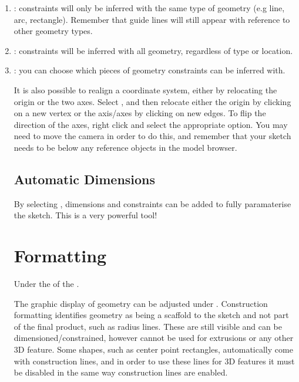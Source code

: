 \begin{enumerate}
    \item {}: constraints will only be inferred with the same type of geometry (e.g line, arc, rectangle). Remember that guide lines will still appear with reference to other geometry types.
    \item {}: constraints will be inferred with all geometry, regardless of type or location.
    \item {}: you can choose which pieces of geometry constraints can be inferred with.

It is also possible to realign a coordinate system, either by relocating the origin or the two axes. Select , and then relocate either the origin by clicking on a new vertex or the axis/axes by clicking on new edges. To flip the direction of the axes, right click and select the appropriate option. You may need to move the camera in order to do this, and remember that your sketch needs to be below any reference objects in the model browser. 

\subsection{Automatic Dimensions}

\easydifficulty

By selecting , dimensions and \newline constraints can be added to fully paramaterise the sketch. This is a very powerful tool!

\section{Formatting}

\begin{where-to-find}
    Under the  of the .
    \end{where-to-find}

\mediumdifficulty

The graphic display of geometry can be adjusted under . Construction formatting identifies geometry as being a scaffold to the sketch and not part of the final product, such as radius lines. These are still visible and can be dimensioned/constrained, however cannot be used for extrusions or any other 3D feature. Some shapes, such as center point rectangles, automatically come with construction lines, and in order to use these lines for 3D features it must be disabled in the same way construction lines are enabled.


\end{enumerate}
